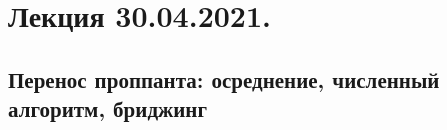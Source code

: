\documentclass[main.tex]{subfiles}
\begin{document}

\section{Лекция 30.04.2021.}

\subsection{Перенос проппанта: осреднение, численный алгоритм, бриджинг}
\end{document}
